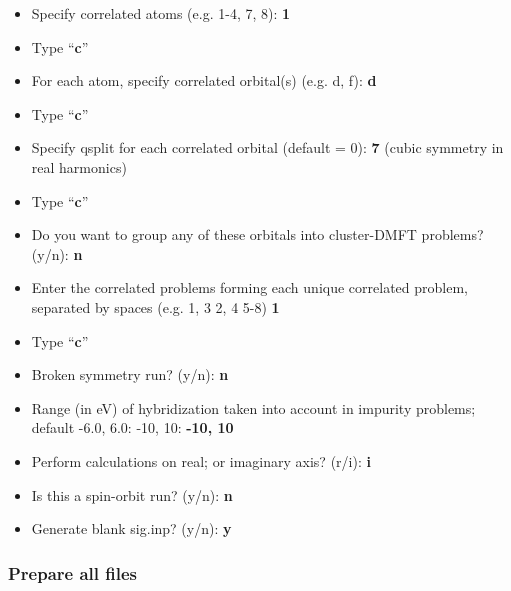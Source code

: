 \documentclass[12 pt]{article}
\begin{document}
  \begin{itemize}

    \item Specify correlated atoms (e.g. 1-4, 7, 8): \textbf{1}

    \item Type ``\textbf{c}''

    \item For each atom, specify correlated orbital(s) (e.g. d, f): \textbf{d}

    \item Type ``\textbf{c}''

    \item Specify qsplit for each correlated orbital (default = 0): \textbf{7} (cubic symmetry in real harmonics) 

    \item Type ``\textbf{c}''

    \item Do you want to group any of these orbitals into cluster-DMFT problems? (y/n): \textbf{n}

    \item Enter the correlated problems forming each unique correlated problem, separated by spaces (e.g. 
1, 3 2, 4 5-8) \textbf{1}

    \item Type ``\textbf{c}''

    \item Broken symmetry run? (y/n): \textbf{n}

    \item Range (in eV) of hybridization taken into account in impurity problems; default -6.0, 6.0: -10, 10: 
\textbf{-10, 10}

    \item Perform calculations on real; or imaginary axis? (r/i): \textbf{i}

    \item Is this a spin-orbit run? (y/n): \textbf{n}

    \item Generate blank sig.inp? (y/n): \textbf{y}

  \end{itemize}
  
  \cleardoublepage

	\subsubsection{Prepare all files}
\end{document}
